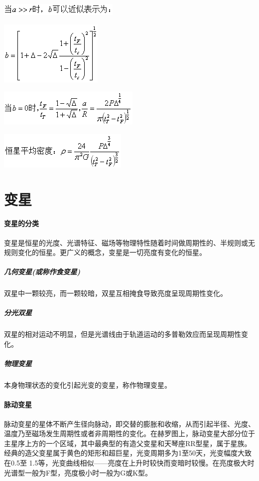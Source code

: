 \includegraphics{A_4.png}

\includegraphics{A_5.png}

\includegraphics{A_6.png}

\includegraphics{A_7.png}


\section{变星}
\paragraph{变星的分类}变星是恒星的光度、光谱特征、磁场等物理特性随着时间做周期性的、半规则或无规则变化的恒星。更广义的概念，变星是一切亮度有变化的恒星。
\subparagraph{几何变星(或称作食变星)}双星中一颗较亮，而一颗较暗，双星互相掩食导致亮度呈现周期性变化。

\subparagraph{分光双星}双星的相对运动不明显，但是光谱线由于轨道运动的多普勒效应而呈现周期性变化。

\subparagraph{物理变星}本身物理状态的变化引起光变的变星，称作物理变星。
\paragraph{脉动变星}脉动变星的星体不断产生径向脉动，即交替的膨胀和收缩，从而引起半径、光度、温度乃至磁场发生周期性或者非周期性的变化。在赫罗图上，脉动变星大部分位于主星序上方的一个区域，其中最典型的有造父变星和天琴座RR型星，属于星族。经典的造父变星属于黄色的矩形和超巨星，光变周期多为1至50天，光变幅度大致在0.5至 1.5等，光变曲线相似——亮度在上升时较快而变暗时较慢。在亮度极大时光谱型一般为F型，亮度极小时一般为G或K型。

